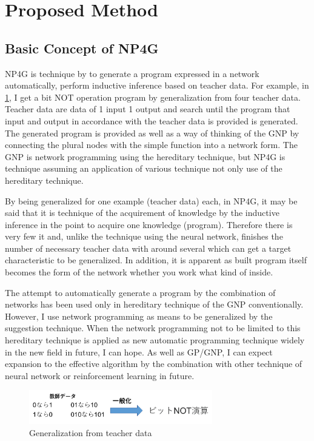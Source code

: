 \documentclass{article}
\begin{document}
\section {Proposed Method}
\subsection{Basic Concept of NP4G}
NP4G is technique by to generate a program expressed in a network automatically, perform inductive inference based on teacher data.
For example, in \ref{fig:summary}, I get a bit NOT operation program by generalization from four teacher data.
Teacher data are data of 1 input 1 output and search until the program that input and output in accordance with the teacher data is provided is generated.
The generated program is provided as well as a way of thinking of the GNP by connecting the plural nodes with the simple function into a network form.
The GNP is network programming using the hereditary technique, but NP4G is technique assuming an application of various technique not only use of the hereditary technique.

By being generalized for one example (teacher data) each, in NP4G, it may be said that it is technique of the acquirement of knowledge by the inductive inference in the point to acquire one knowledge (program).
Therefore there is very few it and, unlike the technique using the neural network, finishes the number of necessary teacher data with around several which can get a target characteristic to be generalized.
In addition, it is apparent as built program itself becomes the form of the network whether you work what kind of inside.

The attempt to automatically generate a program by the combination of networks has been used only in hereditary technique of the GNP conventionally.
However, I use network programming as means to be generalized by the suggestion technique.
When the network programming not to be limited to this hereditary technique is applied as new automatic programming technique widely in the new field in future, I can hope.
As well as GP/GNP, I can expect expansion to the effective algorithm by the combination with other technique of neural network or reinforcement learning in future.

\begin{figure}[t]
\begin{center}
\includegraphics[width=80mm]{summary.png}
\end{center}
\caption {Generalization from teacher data}
\label{fig:summary}
\end{figure}
\end{document}
